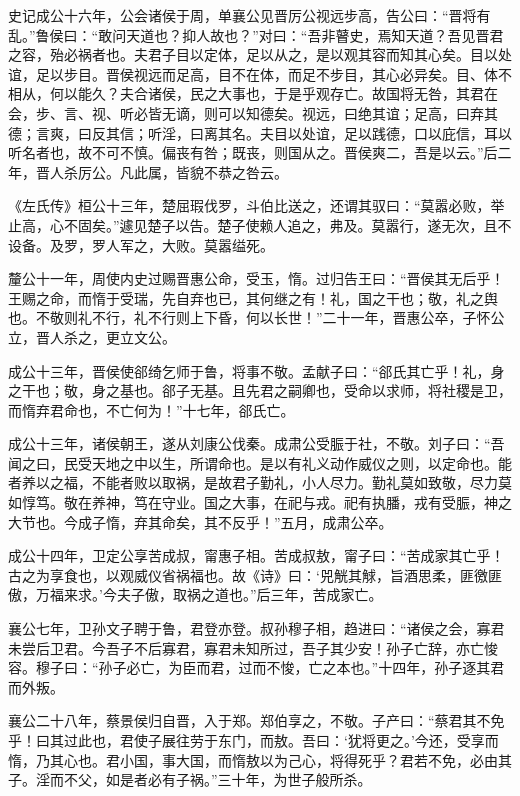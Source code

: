 \documentclass[12pt,UTF8]{ctexbook}
\begin{document}
史记成公十六年，公会诸侯于周，单襄公见晋厉公视远步高，告公曰：“晋将有乱。”鲁侯曰：“敢问天道也？抑人故也？”对曰：“吾非瞽史，焉知天道？吾见晋君之容，殆必祸者也。夫君子目以定体，足以从之，是以观其容而知其心矣。目以处谊，足以步目。晋侯视远而足高，目不在体，而足不步目，其心必异矣。目、体不相从，何以能久？夫合诸侯，民之大事也，于是乎观存亡。故国将无咎，其君在会，步、言、视、听必皆无谪，则可以知德矣。视远，曰绝其谊；足高，曰弃其德；言爽，曰反其信；听淫，曰离其名。夫目以处谊，足以践德，口以庇信，耳以听名者也，故不可不慎。偏丧有咎；既丧，则国从之。晋侯爽二，吾是以云。”后二年，晋人杀厉公。凡此属，皆貌不恭之咎云。



《左氏传》桓公十三年，楚屈瑕伐罗，斗伯比送之，还谓其驭曰：“莫嚣必败，举止高，心不固矣。”遽见楚子以告。楚子使赖人追之，弗及。莫嚣行，遂无次，且不设备。及罗，罗人军之，大败。莫嚣缢死。



釐公十一年，周使内史过赐晋惠公命，受玉，惰。过归告王曰：“晋侯其无后乎！王赐之命，而惰于受瑞，先自弃也已，其何继之有！礼，国之干也；敬，礼之舆也。不敬则礼不行，礼不行则上下昏，何以长世！”二十一年，晋惠公卒，子怀公立，晋人杀之，更立文公。



成公十三年，晋侯使郤绮乞师于鲁，将事不敬。孟献子曰：“郤氏其亡乎！礼，身之干也；敬，身之基也。郤子无基。且先君之嗣卿也，受命以求师，将社稷是卫，而惰弃君命也，不亡何为！”十七年，郤氏亡。



成公十三年，诸侯朝王，遂从刘康公伐秦。成肃公受脤于社，不敬。刘子曰：“吾闻之曰，民受天地之中以生，所谓命也。是以有礼义动作威仪之则，以定命也。能者养以之福，不能者败以取祸，是故君子勤礼，小人尽力。勤礼莫如致敬，尽力莫如惇笃。敬在养神，笃在守业。国之大事，在祀与戎。祀有执膰，戎有受脤，神之大节也。今成子惰，弃其命矣，其不反乎！”五月，成肃公卒。



成公十四年，卫定公享苦成叔，甯惠子相。苦成叔敖，甯子曰：“苦成家其亡乎！古之为享食也，以观威仪省祸福也。故《诗》曰：‘兕觥其觩，旨酒思柔，匪徼匪傲，万福来求。’今夫子傲，取祸之道也。”后三年，苦成家亡。



襄公七年，卫孙文子聘于鲁，君登亦登。叔孙穆子相，趋进曰：“诸侯之会，寡君未尝后卫君。今吾子不后寡君，寡君未知所过，吾子其少安！孙子亡辞，亦亡悛容。穆子曰：“孙子必亡，为臣而君，过而不悛，亡之本也。”十四年，孙子逐其君而外叛。



襄公二十八年，蔡景侯归自晋，入于郑。郑伯享之，不敬。子产曰：“蔡君其不免乎！曰其过此也，君使子展往劳于东门，而敖。吾曰：‘犹将更之。’今还，受享而惰，乃其心也。君小国，事大国，而惰敖以为己心，将得死乎？君若不免，必由其子。淫而不父，如是者必有子祸。”三十年，为世子般所杀。
\end{document}

